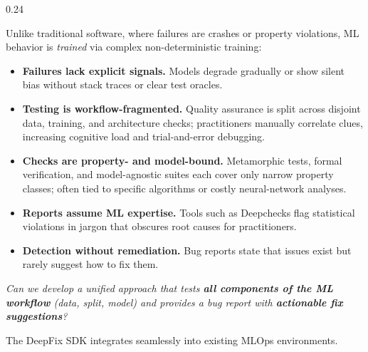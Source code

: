 \documentclass[final,t]{beamer}
\begin{document}
\begin{frame}[fragile]
\begin{columns}[T]
\begin{column}{0.24\textwidth}

\begin{posterblock}[Motivation]
  \fontsize{28}{36}\selectfont\color{BodyText}\justifying
  Unlike traditional software, where failures are crashes or property violations, ML behavior is \emph{trained} via complex non-deterministic training:
  \vspace{4mm}
  \begin{itemize}[leftmargin=10mm, itemsep=8mm, label={\textcolor{TUMAccent}{\textbullet}}]
    \item \textbf{Failures lack explicit signals.} Models degrade gradually or show silent bias without stack traces or clear test oracles.
    \item \textbf{Testing is workflow-fragmented.} Quality assurance is split across disjoint data, training, and architecture checks; practitioners manually correlate clues, increasing cognitive load and trial-and-error debugging.
    \item \textbf{Checks are property- and model-bound.} Metamorphic tests, formal verification, and model-agnostic suites each cover only narrow property classes; often tied to specific algorithms or costly neural-network analyses.
    \item \textbf{Reports assume ML expertise.} Tools such as Deepchecks flag statistical violations in jargon that obscures root causes for practitioners.
    \item \textbf{Detection without remediation.} Bug reports state that issues exist but rarely suggest how to fix them.
  \end{itemize}
\end{posterblock}

\vspace{12mm}

\begin{highlightblock}
  \fontsize{30}{38}\selectfont\color{TUMDarkBlue}
  \centering\itshape
  Can we develop a unified approach that tests \textbf{all components of the ML workflow} (data, split, model) and provides a bug report with \textbf{actionable fix suggestions}?
\end{highlightblock}

\vspace{12mm}

\begin{posterblock}
  \fontsize{26}{32}\selectfont\color{BodyText}\justifying
  The DeepFix SDK integrates seamlessly into existing MLOps environments.


\end{posterblock}
\end{column}
\end{columns}
\end{frame}
\end{document}
